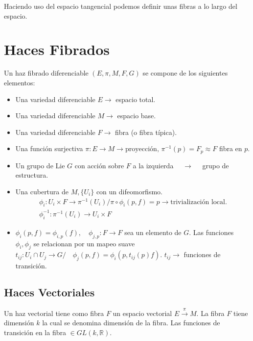 \documentclass{article}
\begin{document}
\hfill

\hfill 

\hfill 

Haciendo uso del espacio tangencial podemos definir unas fibras a lo largo del espacio. 

\section{Haces Fibrados }
Un haz fibrado diferenciable $ (E,\pi,M,F,G) $ se compone de los siguientes elementos: 
\begin{itemize}
  \item Una variedad diferenciable $ E \rightarrow  $ espacio total. 
  \item Una variedad diferenciable $ M \rightarrow  $ espacio base. 
  \item Una variedad diferenciable $ F \rightarrow  $ fibra (o fibra típica). 
  \item Una función surjectiva $ \pi: E \rightarrow M \rightarrow \text{proyección, }\pi ^ {-1 }(p) = F _{p } \approx F  $ fibra en $ p  $.
  \item Un grupo de Lie $ G  $ con acción sobre $ F  $ a la izquierda $ \quad \rightarrow \quad  $ grupo de estructura. 
  \item Una cubertura de $M, \{ U_i \}$ con un difeomorfismo. 
    \begin{gather*}
      \phi_i : U_i \times F \rightarrow \pi ^ {-1 }(U_i) / \pi\circ \phi_i (p,f) = p \rightarrow \text{trivialización local.}\\
      \phi _{i }  ^ {-1 }: \pi ^ {-1 }(U_i ) \rightarrow U_i \times F 
    \end{gather*}
  \item $ \phi_i (p,f) = \phi _{i,p } (f), \quad \phi _{j,p } : F \rightarrow F  $ sea un elemento de $ G  $. Las funciones $ \phi_i,\phi_j  $ se relacionan por un mapeo suave $ t _{ij } : U_i \cap U_j \rightarrow G / \quad \phi_j (p,f) = \phi_i (p,t _{ij } (p)f ) $. $ t _{ij } \rightarrow  $ funciones de transición.
\end{itemize}

\subsection{Haces Vectoriales } 
Un haz vectorial tiene como fibra $ F  $ un espacio vectorial $ E \overset{\pi}{\rightarrow } M $. La fibra $ F  $ tiene dimensión $ k  $ la cual se denomina dimensión de la fibra. Las funciones de transición en la fibra $ \in GL(k, \mathbb{R}) $. 
\end{document}
